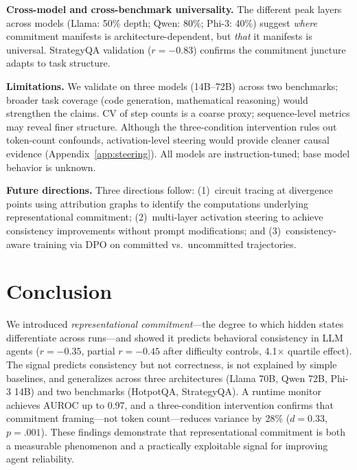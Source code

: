 \documentclass{article}
\begin{document}
\textbf{Cross-model and cross-benchmark universality.} The different peak layers across models (Llama: 50\% depth; Qwen: 80\%; Phi-3: 40\%) suggest \emph{where} commitment manifests is architecture-dependent, but \emph{that} it manifests is universal. StrategyQA validation ($r = -0.83$) confirms the commitment juncture adapts to task structure.

\textbf{Limitations.} We validate on three models (14B--72B) across two benchmarks; broader task coverage (code generation, mathematical reasoning) would strengthen the claims. CV of step counts is a coarse proxy; sequence-level metrics may reveal finer structure. Although the three-condition intervention rules out token-count confounds, activation-level steering would provide cleaner causal evidence (Appendix~\ref{app:steering}). All models are instruction-tuned; base model behavior is unknown.

\textbf{Future directions.} Three directions follow: (1)~circuit tracing at divergence points using attribution graphs \citep{anthropic_circuits} to identify the computations underlying representational commitment; (2)~multi-layer activation steering to achieve consistency improvements without prompt modifications; and (3)~consistency-aware training via DPO on committed vs.\ uncommitted trajectories.

\section{Conclusion}

We introduced \emph{representational commitment}---the degree to which hidden states differentiate across runs---and showed it predicts behavioral consistency in LLM agents ($r = -0.35$, partial $r = -0.45$ after difficulty controls, 4.1$\times$ quartile effect). The signal predicts consistency but not correctness, is not explained by simple baselines, and generalizes across three architectures (Llama 70B, Qwen 72B, Phi-3 14B) and two benchmarks (HotpotQA, StrategyQA). A runtime monitor achieves AUROC up to 0.97, and a three-condition intervention confirms that commitment framing---not token count---reduces variance by 28\% ($d = 0.33$, $p = .001$). These findings demonstrate that representational commitment is both a measurable phenomenon and a practically exploitable signal for improving agent reliability.
\end{document}
